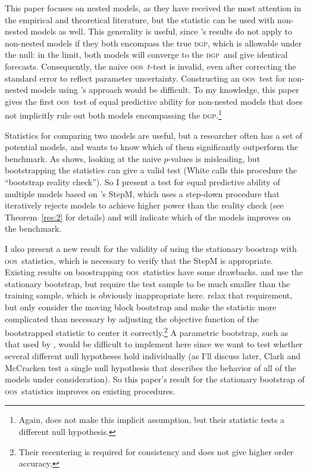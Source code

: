 \documentclass[12pt]{article}
\newcommand\citepos[2][]{\citeauthor{#2}'s \citeyearpar[#1]{#2}}
\theoremstyle{definition}
\newcommand{\dgp}{\textsc{dgp}}
\newcommand{\oos}{\textsc{oos}}
\begin{document}
This paper focuses on nested models, as they have received the most
attention in the empirical and theoretical literature, but the
statistic can be used with non-nested models as well.  This generality
is useful, since \citepos{Wes:96} results do not apply to non-nested
models if they both encompass the true \dgp, which is allowable under
the null: in the limit, both models will converge to the \dgp\ and
give identical forecasts.  Consequently, the naive \oos\ $t$-test is
invalid, even after correcting the standard error to reflect parameter
uncertainty.  Constructing an \oos\ test for non-nested models using
\citepos{ClM:01} approach would be difficult.  To my knowledge, this
paper gives the first \oos\ test of equal predictive ability for
non-nested models that does not implicitly rule out both models
encompassing the \dgp.\footnote{Again, \citet{GiW:06} does not make
  this implicit assumption, but their statistic tests a different null
  hypothesis.}

Statistics for comparing two models are useful, but a researcher often
has a set of potential models, and wants to know which of them
significantly outperform the benchmark.  As \citet{Whi:00} shows,
looking at the naive $p$-values is misleading, but bootstrapping the
statistics can give a valid test (White calls this procedure the
``bootstrap reality check'').  So I present a test for equal
predictive ability of multiple models based on \citepos{RoW:05} StepM,
which uses a step-down procedure that iteratively rejects models to
achieve higher power than the reality check (see Theorem~\ref{res:2}
for details) and will indicate which of the models improves on the
benchmark.

I also present a new result for the validity of using the stationary
boostrap with \oos\ statistics, which is necessary to verify that the
StepM is appropriate.  Existing results on boostrapping \oos\
statistics have some drawbacks.  \citet{Whi:00} and \citet{Han:05} use
the stationary bootstrap, but require the test sample to be much
smaller than the training sample, which is obviously inappropriate
here.  \citet{CoS:07} relax that requirement, but only consider the
moving block bootstrap \citep{LiS:92,Kun:89} and make the statistic
more complicated than necessary by adjusting the objective function of
the bootstrapped statistic to center it correctly.\footnote{Their
  recentering is required for consistency and does not give higher
  order accuracy.}  A parametric bootstrap, such as that used by
\citet{ClM:11}, would be difficult to implement here since we want to
test whether several different null hypotheses hold individually (as
I'll discuss later, Clark and McCracken test a single null hypothesis
that describes the behavior of all of the models under consideration).
So this paper's result for the stationary bootstrap of \oos\ statistics
improves on existing procedures.
\end{document}
